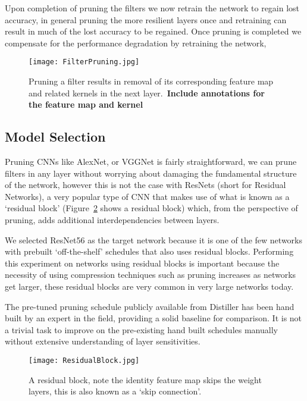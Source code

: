 \documentclass[../Dissertation.tex]{subfiles}
\begin{document}
\noindent Upon completion of pruning the filters we now retrain the network to regain lost accuracy, in general pruning the more resilient layers once and retraining can result in much of the lost accuracy to be regained.
Once pruning is completed we compensate for the performance degradation by retraining the network, 

    \begin{figure}[H]
        \texttt{[image: FilterPruning.jpg]}
        \caption{Pruning a filter results in removal of its corresponding feature map and related kernels in the next layer.~\autocite{liPruningFiltersEfficient2017}\textbf{\color{red}Include annotations for the feature map and kernel}}
        \label{fig:FeaturemapAndKernel}
    \end{figure}




\subsection{Model Selection}\label{sec:ModelSelection}

Pruning CNNs like AlexNet, or VGGNet is fairly straightforward, we can prune filters in any layer without worrying about damaging the fundamental structure of the network, however this is not the case with ResNets (short for Residual Networks),  a very popular type of CNN that makes use of what is known as a `residual block' (Figure~\ref{fig:ResidualBlock} shows a residual block) which, from the perspective of pruning, adds additional interdependencies between layers.

We selected ResNet56 as the target network because it is one of the few networks with prebuilt `off-the-shelf' schedules that also uses residual blocks. 
Performing this experiment on networks using residual blocks is important because the necessity of using compression techniques such as pruning increases as networks get larger, these residual blocks are very common in very large networks today. 

The pre-tuned pruning schedule publicly available from Distiller has been hand built by an expert in the field, providing a solid baseline for comparison.
It is not a trivial task to improve on the pre-existing hand built schedules manually without extensive understanding of layer sensitivities.  

\begin{figure}[H]
    \centering
    \texttt{[image: ResidualBlock.jpg]}
    \caption{A residual block, note the identity feature map skips the weight layers, this is also known as a `skip connection'.}
    \label{fig:ResidualBlock}
\end{figure}
\end{document}
